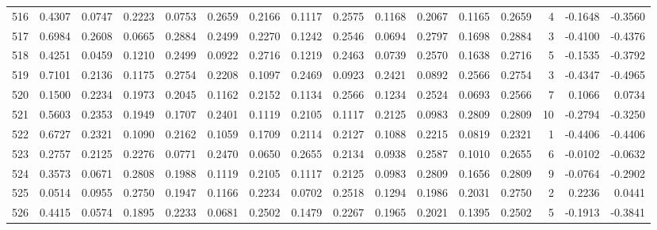 \begin{tabular}{lrrrrrrrrrrrrrrr}
516 &      0.4307 &  0.0747 &  0.2223 &  0.0753 &  0.2659 &  0.2166 &  0.1117 &  0.2575 &  0.1168 &  0.2067 &   0.1165 &     0.2659 &      4 &                   -0.1648 &                    -0.3560 \\
517 &      0.6984 &  0.2608 &  0.0665 &  0.2884 &  0.2499 &  0.2270 &  0.1242 &  0.2546 &  0.0694 &  0.2797 &   0.1698 &     0.2884 &      3 &                   -0.4100 &                    -0.4376 \\
518 &      0.4251 &  0.0459 &  0.1210 &  0.2499 &  0.0922 &  0.2716 &  0.1219 &  0.2463 &  0.0739 &  0.2570 &   0.1638 &     0.2716 &      5 &                   -0.1535 &                    -0.3792 \\
519 &      0.7101 &  0.2136 &  0.1175 &  0.2754 &  0.2208 &  0.1097 &  0.2469 &  0.0923 &  0.2421 &  0.0892 &   0.2566 &     0.2754 &      3 &                   -0.4347 &                    -0.4965 \\
520 &      0.1500 &  0.2234 &  0.1973 &  0.2045 &  0.1162 &  0.2152 &  0.1134 &  0.2566 &  0.1234 &  0.2524 &   0.0693 &     0.2566 &      7 &                    0.1066 &                     0.0734 \\
521 &      0.5603 &  0.2353 &  0.1949 &  0.1707 &  0.2401 &  0.1119 &  0.2105 &  0.1117 &  0.2125 &  0.0983 &   0.2809 &     0.2809 &     10 &                   -0.2794 &                    -0.3250 \\
522 &      0.6727 &  0.2321 &  0.1090 &  0.2162 &  0.1059 &  0.1709 &  0.2114 &  0.2127 &  0.1088 &  0.2215 &   0.0819 &     0.2321 &      1 &                   -0.4406 &                    -0.4406 \\
523 &      0.2757 &  0.2125 &  0.2276 &  0.0771 &  0.2470 &  0.0650 &  0.2655 &  0.2134 &  0.0938 &  0.2587 &   0.1010 &     0.2655 &      6 &                   -0.0102 &                    -0.0632 \\
524 &      0.3573 &  0.0671 &  0.2808 &  0.1988 &  0.1119 &  0.2105 &  0.1117 &  0.2125 &  0.0983 &  0.2809 &   0.1656 &     0.2809 &      9 &                   -0.0764 &                    -0.2902 \\
525 &      0.0514 &  0.0955 &  0.2750 &  0.1947 &  0.1166 &  0.2234 &  0.0702 &  0.2518 &  0.1294 &  0.1986 &   0.2031 &     0.2750 &      2 &                    0.2236 &                     0.0441 \\
526 &      0.4415 &  0.0574 &  0.1895 &  0.2233 &  0.0681 &  0.2502 &  0.1479 &  0.2267 &  0.1965 &  0.2021 &   0.1395 &     0.2502 &      5 &                   -0.1913 &                    -0.3841 \\

\end{tabular}

